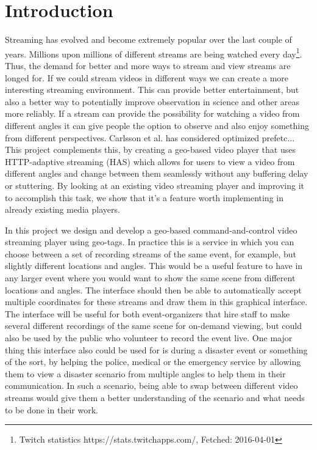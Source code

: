 \chapter{Introduction}
\label{cha:introduction}

Streaming has evolved and become extremely popular over the last couple of years. Millions upon millions of different streams are being watched every day\footnote{Twitch statistics https://stats.twitchapps.com/, Fetched: 2016-04-01}. Thus, the demand for better and more ways to stream and view streams are longed for. If we could stream videos in different ways we can create a more interesting streaming environment. This can provide better entertainment, but also a better way to potentially improve observation in science and other areas more reliably. If a stream can provide the possibility for watching a video from different angles it can give people the option to observe and also enjoy something from different perspectives. Carlsson et al.\cite{optimizedstreaming} has considered optimized prefetc... This project complements this, by creating a geo-based video player that uses HTTP-adaptive streaming (HAS) which allows for users to view a video from different angles and change between them seamlessly without any buffering delay or stuttering. By looking at an existing video streaming player and improving it to accomplish this task, we show that it's a feature worth implementing in already existing media players.

In this project we design and develop a geo-based command-and-control video streaming player using geo-tags. In practice this is a service in which you can choose between a set of recording streams of the same event, for example, but slightly different locations and angles. This would be a useful feature to have in any larger event where you would want to show the same scene from different locations and angles. The interface should then be able to automatically accept multiple coordinates for these streams and draw them in this graphical interface. The interface will be useful for both event-organizers that hire staff to make several different recordings of the same scene for on-demand viewing, but could also be used by the public who volunteer to record the event live. One major thing this interface also could be used for is during a disaster event or something of the sort, by helping the police, medical or the emergency service by allowing them to view a disaster scenario from multiple angles to help them in their communication. In such a scenario, being able to swap between different video streams would give them a better understanding of the scenario and what needs to be done in their work.

